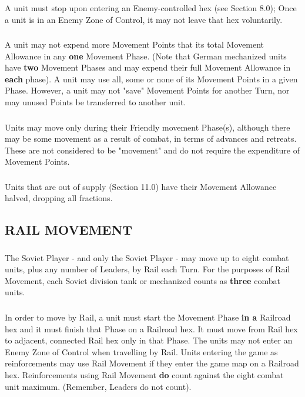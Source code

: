 \subsubsection{} A unit must stop upon entering an Enemy-controlled hex (see Section 8.0); Once a unit is in an Enemy Zone of Control, it may not leave that hex voluntarily.

\subsubsection{} A unit may not expend more Movement Points that its total Movement Allowance in any \textbf{one} Movement Phase. (Note that German mechanized units have \textbf{two} Movement Phases and may expend their full Movement Allowance in \textbf{each} phase). A unit may use all, some or none of its Movement Points in a given Phase. However, a unit may not "save" Movement Points for another Turn, nor may unused Points be transferred to another unit.

\subsubsection{} Units may move only during their Friendly movement Phase(s), although there may be some movement as a result of combat, in terms of advances and retreats. These are not considered to be "movement" and do not require the expenditure of Movement Points.

\subsubsection{} Units that are out of supply (Section 11.0) have their Movement Allowance halved, dropping all fractions.

\subsection{RAIL MOVEMENT}

\subsubsection{} The Soviet Player - and only the Soviet Player - may move up to eight combat units, plus any number of Leaders, by Rail each Turn. For the purposes of Rail Movement, each Soviet division tank or mechanized counts as \textbf{three} combat units.

\subsubsection{} In order to move by Rail, a unit must start the Movement Phase \textbf{in a} Railroad hex and it must finish that Phase on a Railroad hex. It must move from Rail hex to adjacent, connected Rail hex only in that Phase. The units may not enter an Enemy Zone of Control when travelling by Rail. Units entering the game as reinforcements may use Rail Movement if they enter the game map on a Railroad hex. Reinforcements using Rail Movement \textbf{do} count against the eight combat unit maximum. (Remember, Leaders do not count).

